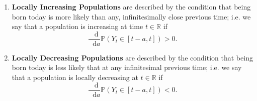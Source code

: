 \documentclass[11pt,oneside,english,reqno,dvipsnames,table]{amsart}
\numberwithin{equation}{section}
\theoremstyle{plain}
\theoremstyle{definition}
\theoremstyle{remark}
\theoremstyle{plain}
\theoremstyle{plain}
\theoremstyle{plain}
\theoremstyle{plain}
\theoremstyle{plain}
\theoremstyle{plain}
\theoremstyle{plain}
\newcommand{\red}[1]{#1}
\newcommand{\blue}[1]{#1}
\newcommand{\cP}{\mathcal{P}}
\newcommand{\RR}{\mathbb{R}}
\newcommand{\dd}{\mathop{}\!\mathrm{d}}
\newcommand{\mbP}{\mathbb{P}}
\newcommand{\mbR}{\mathbb{R}}
\numberwithin{thm}{section}
\begin{document}
\begin{enumerate}
    \item \label{it:loc_grow}\textbf{Locally Increasing Populations} are described by the condition that being born today is more likely than any, infinitesimally close previous time; i.e. we say that a population is increasing at time $t \in \mbR$ if
    \begin{equation*}
       \frac{\dd}{\dd a} \mbP(Y_t \in [t-a,t]) >0. 
    \end{equation*}
   \item \label{it:loc_shrink} \textbf{Locally Decreasing Populations} are described by the condition that being born today is less likely that at any infinitesimal previous time; i.e. we say that a population is locally decreasing at $t\in \mbR$ if  
   \begin{equation*}
       \frac{\dd}{\dd a} \mbP(Y_t \in [t-a,t]) <0.
   \end{equation*}
\end{enumerate}
%
%
%
%
%


\end{document}
